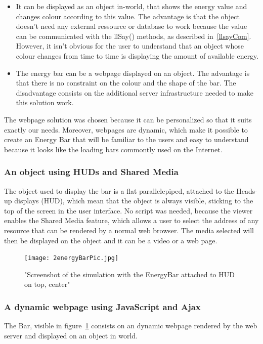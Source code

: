 \begin{itemize}
\item It can be displayed as an object in-world, that shows the energy value and changes colour according to this value. The advantage is that the object doesn't need any external ressource or database to work because the value can be communicated with the llSay() methods, as described in~\ref{llsayCom}. However, it isn't obvious for the user to understand that an object whose colour changes from time to time is displaying the amount of available energy.
\item The energy bar can be a webpage displayed on an object. The advantage is that there is no constraint on the colour and the shape of the bar. The disadvantage consists on the additional server infrastructure needed to make this solution work.
\end{itemize}

The webpage solution was chosen because it can be personalized so that it suits exactly our needs. Moreover, webpages are dynamic, which make it possible to create an Energy Bar that will be familiar to the users and easy to understand because it looks like the loading bars commontly used on the Internet.\\

\subsubsection{An object using HUDs and Shared Media} The object used to display the bar is a flat parallelepiped, attached to the Heads-up displays (HUD), which mean that the object is always visible, sticking to the top of the screen in the user interface. No script was needed, because the viewer enables the Shared Media\cite{sharedmediaWebsite} feature, which allows a user to select the address of any resource that can be rendered by a normal web browser. The media selected will then be displayed on the object and it can be a video or a web page.\\

\begin{figure}[h]
  \caption{"Screenshot of the simulation with the EnergyBar attached to HUD on top, center"}
  \centering
  \texttt{[image: 2energyBarPic.jpg]}
  \label{fig:2energyBarPic}
\end{figure}


\subsubsection{A dynamic webpage using JavaScript and Ajax}
The Bar, visible in figure~\ref{fig:2energyBarPic} consists on an dynamic webpage rendered by the web server and displayed on an object in world. 

